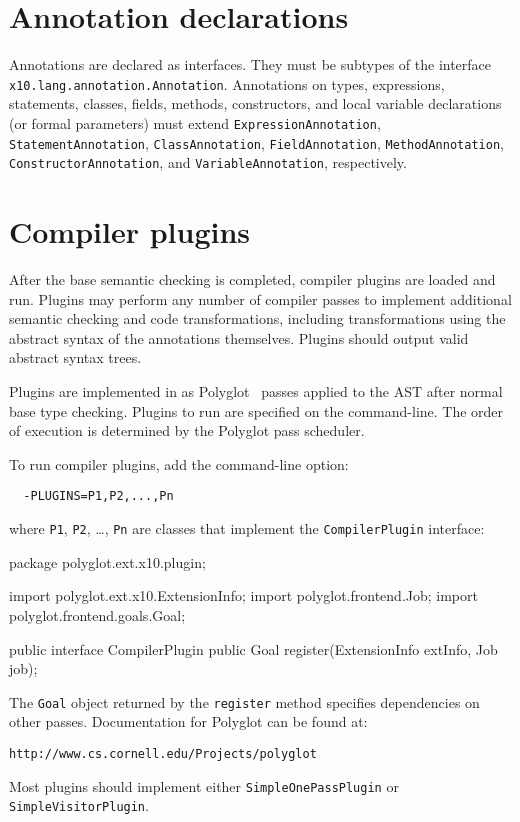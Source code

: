 \section{Annotation declarations}

Annotations are declared as interfaces.  They must be
subtypes of the interface \texttt{x10.lang.annotation.Annotation}.
Annotations on types, expressions, statements, classes, fields,
methods, constructors, and local variable declarations (or
formal parameters)
must extend
\texttt{ExpressionAnnotation},
\texttt{StatementAnnotation},
\texttt{ClassAnnotation},
\texttt{FieldAnnotation},
\texttt{MethodAnnotation},
\texttt{ConstructorAnnotation}, and
\texttt{VariableAnnotation}, respectively.

\section{Compiler plugins}

After the base \Xten{} semantic checking is completed, 
compiler plugins are loaded and run.  Plugins may perform
any number of compiler passes to implement
additional semantic checking and code transformations, including
transformations using the abstract syntax of the annotations
themselves.  Plugins should output valid \Xten{} abstract
syntax trees.

Plugins are implemented in \Java{} as
Polyglot~\cite{ncm03} passes applied to the AST
after normal base \Xten{} type checking.
Plugins to run are specified on the command-line.  The order of
execution is determined by the Polyglot pass scheduler.

To run compiler plugins, add the command-line option:
\begin{verbatim}
  -PLUGINS=P1,P2,...,Pn
\end{verbatim}
where \texttt{P1}, \texttt{P2}, \dots, \texttt{Pn} are classes that implement the
\texttt{CompilerPlugin} interface:

\begin{xten}
package polyglot.ext.x10.plugin;

import polyglot.ext.x10.ExtensionInfo;
import polyglot.frontend.Job;
import polyglot.frontend.goals.Goal;

public interface CompilerPlugin {
  public Goal
    register(ExtensionInfo extInfo, Job job);
}
\end{xten}

The \texttt{Goal} object returned by the \texttt{register} method specifies dependencies on other passes.
Documentation for Polyglot can be found at:
\begin{verbatim}
http://www.cs.cornell.edu/Projects/polyglot
\end{verbatim}
Most plugins should implement either \texttt{SimpleOnePassPlugin} or
\texttt{SimpleVisitorPlugin}.

